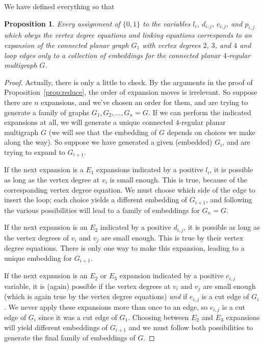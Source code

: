 \documentclass[amsmath,secnumarabic,floatfix,amssymb,nofootinbib,nobibnotes,letterpaper,11pt,tightenlines,showkeys]{revtex4}
\newtheorem{proposition}[theorem]{Proposition}
\theoremstyle{definition}
\newcommand{\loopinsert}{E_1}
\newcommand{\edgedouble}{E_2}
\newcommand{\cutedgedouble}{E_3}
\begin{document}
We have defined everything so that

\begin{proposition}
Every assignment of $\{0,1\}$ to the variables $l_i$, $d_{i,j}$, $c_{i,j}$, and $p_{i,j}$ which obeys the vertex degree equations and linking equations corresponds to an expansion of the connected planar graph $G_1$ with vertex degrees $2$, $3$, and $4$ and loop edges only to a collection of embeddings for the connected planar $4$-regular multigraph $G$.
\end{proposition}

\begin{proof}
Actually, there is only a little to check. By the arguments in the proof of Proposition~\ref{prop:reduce}, the order of expansion moves is irrelevant. So suppose there are $n$ expansions, and we've chosen an order for them,  and are trying to generate a family of graphs $G_1, G_2, \dots, G_n = G$. If we can perform the indicated expansions at all, we will generate a unique connected $4$-regular planar multigraph $G$ (we will see that the embedding of $G$ depends on choices we make along the way).  So suppose we have generated a given (embedded) $G_i$, and are trying to expand to $G_{i+1}$.

If the next expansion is a $\loopinsert$ expansions indicated by a positive $l_i$, it is possible as long as the vertex degree at $v_i$ is small enough. This is true, because of the corresponding vertex degree equation.
We must choose which side of the edge to insert the loop; each choice yields a different embedding of $G_{i+1}$, and following the various possibilities will lead to a family of embeddings for $G_n = G$.

If the next expansion is an $\edgedouble$ indicated by a positive $d_{i,j}$, it is possible as long as the vertex degrees of $v_i$ and $v_j$ are small enough. This is true by their vertex degree equations. There is only one way to make this expansion, leading to a unique embedding for $G_{i+1}$.

If the next expansion is an $\edgedouble$ or $\cutedgedouble$ expansion indicated by a positive $c_{i,j}$ variable, it is (again) possible if the vertex degrees at $v_i$ and $v_j$ are small enough (which is again true by the vertex degree equations) \emph{and} if $e_{i,j}$ is a cut edge of $G_i$. We never apply these expansions more than once to an edge, so $e_{i,j}$ is a cut edge of $G_i$ since it was a cut edge of $G_1$. Choosing between $\edgedouble$ and $\cutedgedouble$ expansions will yield different embeddings of $G_{i+1}$ and we must follow both possibilities to generate the final family of embeddings of $G$.


\end{proof}
\end{document}
